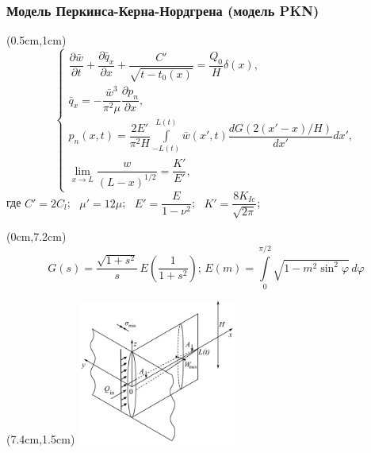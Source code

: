\documentclass{beamer}
\begin{document}

\begin{frame}
\frametitle{Модель Перкинса-Керна-Нордгрена (модель PKN)}

\scriptsize

\begin{textblock*}{7cm}(0.5cm,1cm)
$$
\begin{cases}
\dfrac{\partial\bar{w}}{\partial t}+\dfrac{\partial\bar{q}_x}{\partial x}+\dfrac{C'}{\sqrt{t-t_0(x)}}=\dfrac{Q_0}{H}\delta(x),\\[15pt]
\bar{q}_x=-\dfrac{\bar{w}^3}{\pi^2\mu}\dfrac{\partial p_n}{\partial x},\\[15pt]
p_n(x,t)=\dfrac{2E'}{\pi^2H}\displaystyle\int\limits_{-L(t)}^{L(t)}\bar{w}(x',t)\dfrac{dG(2(x'-x)/H)}{dx'}dx',\\[22pt]
\displaystyle\lim_{x\to L}\dfrac{w}{(L-x)^{1/2}}=\dfrac{K'}{E'},
\end{cases}
$$
где $C'=2C_l$; $\,\,\,\mu'=12\mu$; $\,\,\,E'=\dfrac{E}{1-\nu^2}$; $\,\,\,K'=\dfrac{8K_{Ic}}{\sqrt{2\pi}}$;
\end{textblock*}

\begin{textblock*}{7.9cm}(0cm,7.2cm)
\tiny
$$
G(s)=\frac{\sqrt{1+s^2}}{s}\,E\!\left(\frac{1}{1+s^2}\right)\!;\,E(m)=\int\limits_{0}^{\pi/2}\sqrt{1-m^2\sin^2\!\varphi}\,d\varphi
$$
\end{textblock*}

\begin{textblock*}{7cm}(7.4cm,1.5cm)
\includegraphics[width=5.2cm]{pkn_model_3D.jpg}
\end{textblock*}


\end{frame}
\end{document}
